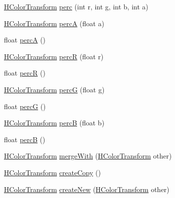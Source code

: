 \begin{DoxyCompactItemize}
\item 
\hyperlink{classhype_1_1colorist_1_1_h_color_transform}{H\-Color\-Transform} \hyperlink{classhype_1_1colorist_1_1_h_color_transform_a31978f7946261d061bfceff7cfc0a648}{perc} (int r, int g, int b, int a)
\item 
\hyperlink{classhype_1_1colorist_1_1_h_color_transform}{H\-Color\-Transform} \hyperlink{classhype_1_1colorist_1_1_h_color_transform_a83f56d1f44ac877ded6fbcc48427c35e}{perc\-A} (float a)
\item 
float \hyperlink{classhype_1_1colorist_1_1_h_color_transform_ac4e92893e54be8822f3480e88b99c658}{perc\-A} ()
\item 
\hyperlink{classhype_1_1colorist_1_1_h_color_transform}{H\-Color\-Transform} \hyperlink{classhype_1_1colorist_1_1_h_color_transform_aff6b8e57c60e590d4d62d5d99ca72bc3}{perc\-R} (float r)
\item 
float \hyperlink{classhype_1_1colorist_1_1_h_color_transform_a11a82ede183e9a997722972de295aa9b}{perc\-R} ()
\item 
\hyperlink{classhype_1_1colorist_1_1_h_color_transform}{H\-Color\-Transform} \hyperlink{classhype_1_1colorist_1_1_h_color_transform_a01bf05464310cb363c9d95deb3e9a83c}{perc\-G} (float g)
\item 
float \hyperlink{classhype_1_1colorist_1_1_h_color_transform_a8ae1a0edae5b9a7763c78d62d44b3b6a}{perc\-G} ()
\item 
\hyperlink{classhype_1_1colorist_1_1_h_color_transform}{H\-Color\-Transform} \hyperlink{classhype_1_1colorist_1_1_h_color_transform_a6df753a2f7760c8da6ecfb8f0a431712}{perc\-B} (float b)
\item 
float \hyperlink{classhype_1_1colorist_1_1_h_color_transform_a900a8f81d9bd5b9fde3dd55612e31fc7}{perc\-B} ()
\item 
\hyperlink{classhype_1_1colorist_1_1_h_color_transform}{H\-Color\-Transform} \hyperlink{classhype_1_1colorist_1_1_h_color_transform_a120b58dd5d1824362b163ff1f218df3c}{merge\-With} (\hyperlink{classhype_1_1colorist_1_1_h_color_transform}{H\-Color\-Transform} other)
\item 
\hyperlink{classhype_1_1colorist_1_1_h_color_transform}{H\-Color\-Transform} \hyperlink{classhype_1_1colorist_1_1_h_color_transform_aa718f95009ba6f6ee7da4670269fdbfc}{create\-Copy} ()
\item 
\hyperlink{classhype_1_1colorist_1_1_h_color_transform}{H\-Color\-Transform} \hyperlink{classhype_1_1colorist_1_1_h_color_transform_a49b19b60ba1595c31cbc95470bf2f5e3}{create\-New} (\hyperlink{classhype_1_1colorist_1_1_h_color_transform}{H\-Color\-Transform} other)

\end{DoxyCompactItemize}
